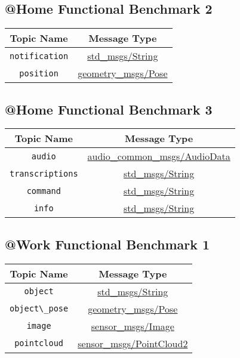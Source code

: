 \documentclass[a4paper]{article}
\begin{document}
\subsection{@Home Functional Benchmark 2}
\begin{center}
\begin{tabular}{|c|c|}\hline
Topic Name & Message Type \\\hline\hline
\verb!notification! & \href{http://docs.ros.org/api/std\_msgs/html/msg/String.html}{std\_msgs/String} \\\hline
\verb!position! & \href{http://docs.ros.org/api/geometry\_msgs/html/msg/Pose.html}{geometry\_msgs/Pose} \\\hline
\end{tabular}
\end{center}


\subsection{@Home Functional Benchmark 3}
\begin{center}
\begin{tabular}{|c|c|}\hline
Topic Name & Message Type \\\hline\hline
\verb!audio! & \href{http://docs.ros.org/hydro/api/audio\_common\_msgs/html/msg/AudioData.html}{audio\_common\_msgs/AudioData} \\\hline
\verb!transcriptions! & \href{http://docs.ros.org/api/std\_msgs/html/msg/String.html}{std\_msgs/String} \\\hline
\verb!command! & \href{http://docs.ros.org/api/std\_msgs/html/msg/String.html}{std\_msgs/String} \\\hline
\verb!info! & \href{http://docs.ros.org/api/std\_msgs/html/msg/String.html}{std\_msgs/String} \\\hline
\end{tabular}
\end{center}


\subsection{@Work Functional Benchmark 1}
\begin{center}
\begin{tabular}{|c|c|}\hline
Topic Name & Message Type \\\hline\hline
\verb!object! & \href{http://docs.ros.org/api/std\_msgs/html/msg/String.html}{std\_msgs/String} \\\hline
\verb!object\_pose! & \href{http://docs.ros.org/api/geometry\_msgs/html/msg/Pose.html}{geometry\_msgs/Pose} \\\hline
\verb!image! & \href{http://docs.ros.org/api/sensor\_msgs/html/msg/Image.html}{sensor\_msgs/Image} \\\hline
\verb!pointcloud! & \href{http://docs.ros.org/api/sensor\_msgs/html/msg/PointCloud2.html}{sensor\_msgs/PointCloud2} \\\hline
\end{tabular}
\end{center}
\end{document}
